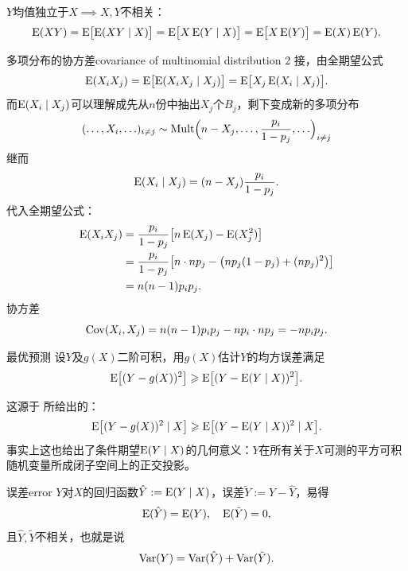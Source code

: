 \begin{corollary}
	$Y$均值独立于$X \implies X,Y$不相关：
	\[
		\operatorname{E}(XY) = \operatorname{E}\bigl[\operatorname{E}(XY \mid X)\bigr] = \operatorname{E}\bigl[X\operatorname{E}(Y \mid X)\bigr] = \operatorname{E}\bigl[X\operatorname{E}(Y)\bigr] = \operatorname{E}(X)\operatorname{E}(Y).
	\]
\end{corollary}

\begin{example}{多项分布的协方差}{covariance of multinomial distribution 2}
	接，由全期望公式
	\[
		\operatorname{E}(X_iX_j) = \operatorname{E}\bigl[\operatorname{E}(X_iX_j \mid X_j)\bigr] = \operatorname{E}\bigl[X_j\operatorname{E}(X_i \mid X_j)\bigr].
	\]
	而$\operatorname{E}(X_i \mid X_j)$可以理解成先从$n$份中抽出$X_j$个$B_j$，剩下变成新的多项分布
	\[
		(\ldots,X_i,\ldots)_{i\neq j} \sim \operatorname{Mult}\Bigl(n - X_j,\ldots,\frac{p_i}{1 - p_j},\ldots\Bigr)_{i\neq j}
	\]
	继而
	\[
		\operatorname{E}(X_i \mid X_j) = (n - X_j)\frac{p_i}{1 - p_j}.
	\]
	代入全期望公式：
	\begin{align*}
		\operatorname{E}(X_iX_j) &= \frac{p_i}{1 - p_j}\bigl[n\operatorname{E}(X_j) - \operatorname{E}(X_j^2)\bigr]\\
		&= \frac{p_i}{1 - p_j}\bigl[n \cdot np_j - \bigl(np_j(1 - p_j) + (np_j)^2\bigr)\bigr]\\
		&= n(n - 1)p_ip_j.
	\end{align*}
	协方差
	\[
		\operatorname{Cov}(X_i,X_j) = n(n - 1)p_ip_j - np_i \cdot np_j = -np_ip_j.
	\]
\end{example}
\begin{theorem}{最优预测}{}
	设$Y$及$g(X)$二阶可积，用$g(X)$估计$Y$的均方误差满足
	\begin{equation}
		\operatorname{E}\bigl[(Y - g(X))^2\bigr] \geqslant \operatorname{E}\bigl[(Y - \operatorname{E}(Y \mid X))^2\bigr].
	\end{equation}
\end{theorem}
这源于 所给出的：
\[
	\operatorname{E}\bigl[(Y - g(X))^2 \mid X\bigr] \geqslant \operatorname{E}\bigl[(Y - \operatorname{E}(Y \mid X))^2 \mid X\bigr].
\]
事实上这也给出了条件期望$\operatorname{E}(Y \mid X)$的几何意义：$Y$在所有关于$X$可测的平方可积随机变量所成闭子空间上的正交投影。
\begin{example}{误差}{error}
	$Y$对$X$的回归函数$\hat Y := \operatorname{E}(Y \mid X)$，误差$\tilde Y := Y - \hat Y$，易得
	\[
		\operatorname{E}(\hat Y) = \operatorname{E}(Y),\quad\operatorname{E}(\tilde Y) = 0,
	\]
	且$\hat Y,\tilde Y$不相关，也就是说
	\begin{equation}\label{eq:ps-prediction-variance}
		\operatorname{Var}(Y) = \operatorname{Var}(\hat Y) + \operatorname{Var}(\tilde Y).
	\end{equation}
	\begin{notecaptionblock}
	\end{notecaptionblock}
\end{example}

